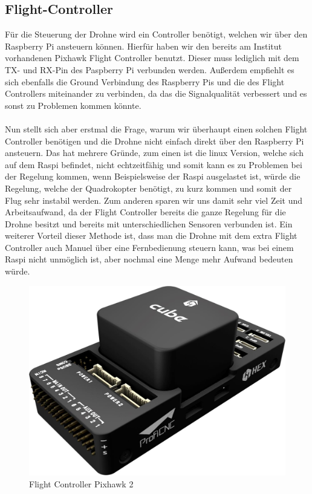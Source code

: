\subsection{Flight-Controller}
Für die Steuerung der Drohne wird ein Controller benötigt, welchen wir über den Raspberry Pi ansteuern können. Hierfür haben wir den bereits am Institut vorhandenen Pixhawk Flight Controller benutzt. Dieser muss lediglich mit dem TX- und RX-Pin des Paspberry Pi verbunden werden. Außerdem empfiehlt es sich ebenfalls die Ground Verbindung des Raspberry Pis und die des Flight Controllers miteinander zu verbinden, da das die Signalqualität verbessert und es sonst zu Problemen kommen könnte.\\
\\
Nun stellt sich aber erstmal die Frage, warum wir überhaupt einen solchen Flight Controller benötigen und die Drohne nicht einfach direkt über den Raspberry Pi ansteuern. Das hat mehrere Gründe, zum einen ist die linux Version, welche sich auf dem Raspi befindet, nicht echtzeitfähig und somit kann es zu Problemen bei der Regelung kommen, wenn Beispielsweise der Raspi ausgelastet ist, würde die Regelung, welche der Quadrokopter benötigt, zu kurz kommen und somit der Flug sehr instabil werden. Zum anderen sparen wir uns damit sehr viel Zeit und Arbeitsaufwand, da der Flight Controller bereits die ganze Regelung für die Drohne besitzt und bereits mit unterschiedlichen Sensoren verbunden ist. Ein weiterer Vorteil dieser Methode ist, dass man die Drohne mit dem extra Flight Controller auch Manuel über eine Fernbedienung steuern kann, was bei einem Raspi nicht unmöglich ist, aber nochmal eine Menge mehr Aufwand bedeuten würde.
\begin{figure}[h]
	\centering
	\includegraphics[scale=0.35]{"Grafiken/pixhawk2.png"}
	\caption{Flight Controller Pixhawk 2\protect\footnotemark}
	\label{fig:meine-grafik}
\end{figure}
